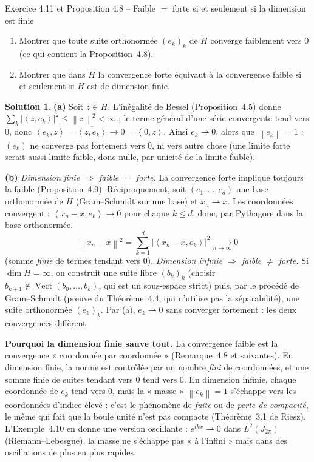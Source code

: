 \documentclass[11pt,a4paper]{article}
\newcommand{\Vect}{\operatorname{Vect}}
\newcommand{\norm}[1]{\left\|#1\right\|}
\newcommand{\ps}[2]{\left\langle #1,#2\right\rangle}
\theoremstyle{definition}
\newtheorem*{solution}{Solution}
\begin{document}
\begin{exo}{Exercice 4.11 et Proposition 4.8 -- Faible $=$ forte si et seulement si la dimension est finie}
\begin{enumerate}[label=(\alph*)]
  \item Montrer que toute suite orthonormée $(e_k)_k$ de $H$ converge faiblement vers $0$ (ce qui contient la Proposition~4.8).
  \item Montrer que dans $H$ la convergence forte équivaut à la convergence faible si et seulement si $H$ est de dimension finie.
\end{enumerate}
\end{exo}

\begin{solution}
\noindent\textbf{(a)} Soit $z\in H$. L'inégalité de Bessel (Proposition~4.5) donne $\sum_k|\ps z{e_k}|^2\le\norm z^2<\infty$ ; le terme général d'une série convergente tend vers $0$, donc $\ps{e_k}z=\overline{\ps z{e_k}}\to0=\ps0z$. Ainsi $e_k\rightharpoonup0$, alors que $\norm{e_k}=1$ : $(e_k)$ ne converge pas fortement vers $0$, ni vers autre chose (une limite forte serait aussi limite faible, donc nulle, par unicité de la limite faible).

\medskip
\noindent\textbf{(b)} \emph{Dimension finie $\Rightarrow$ faible $=$ forte.} La convergence forte implique toujours la faible (Proposition~4.9). Réciproquement, soit $(e_1,\dots,e_d)$ une base orthonormée de $H$ (Gram--Schmidt sur une base) et $x_n\rightharpoonup x$. Les coordonnées convergent : $\ps{x_n-x}{e_k}\to0$ pour chaque $k\le d$, donc, par Pythagore dans la base orthonormée,
\[
\norm{x_n-x}^2=\sum_{k=1}^d|\ps{x_n-x}{e_k}|^2\xrightarrow[n\to\infty]{}0
\]
(somme \emph{finie} de termes tendant vers $0$). \emph{Dimension infinie $\Rightarrow$ faible $\ne$ forte.} Si $\dim H=\infty$, on construit une suite libre $(b_k)_k$ (choisir $b_{k+1}\notin\Vect(b_0,\dots,b_k)$, qui est un sous-espace strict) puis, par le procédé de Gram--Schmidt (preuve du Théorème~4.4, qui n'utilise pas la séparabilité), une suite orthonormée $(e_k)_k$. Par (a), $e_k\rightharpoonup0$ sans converger fortement : les deux convergences diffèrent.
\end{solution}

\begin{pointcle}
\textbf{Pourquoi la dimension finie sauve tout.} La convergence faible est la convergence « coordonnée par coordonnée » (Remarque~4.8 et suivantes). En dimension finie, la norme est contrôlée par un nombre \emph{fini} de coordonnées, et une somme finie de suites tendant vers $0$ tend vers $0$. En dimension infinie, chaque coordonnée de $e_k$ tend vers $0$, mais la « masse » $\norm{e_k}=1$ s'échappe vers les coordonnées d'indice élevé : c'est le phénomène de \emph{fuite} ou de \emph{perte de compacité}, le même qui fait que la boule unité n'est pas compacte (Théorème~3.1 de Riesz). L'Exemple~4.10 en donne une version oscillante : $e^{ikx}\rightharpoonup0$ dans $L^2(J_{2\pi})$ (Riemann--Lebesgue), la masse ne s'échappe pas « à l'infini » mais dans des oscillations de plus en plus rapides.
\end{pointcle}
\end{document}
